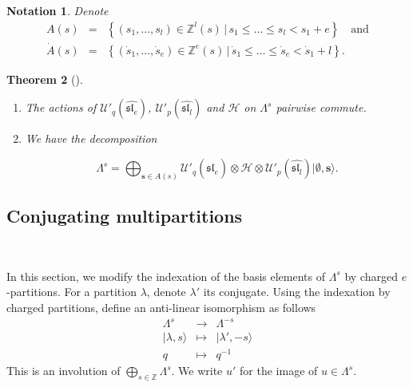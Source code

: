 \documentclass[twoside,12pt]{amsart}
\theoremstyle{plain}
\newcommand{\cH}{\mathcal{H}}
\newcommand{\Z}{\mathbb{Z}}
\newcommand{\bs}{\mathbf{s}}
\newcommand{\la}{\lambda}
\newcommand{\La}{\Lambda}
\newcommand{\dA}{\dot{A}}
\newcommand{\ds}{\dot{s}}
\newcommand{\lra}{\longrightarrow}
\newcommand{\Ue}{\mathcal{U}'_q (\widehat{\mathfrak{sl}_e})}
\newcommand{\Ul}{\mathcal{U}'_p (\widehat{\mathfrak{sl}_l})}
\newcommand{\bemp}{\boldsymbol{\emptyset}}
\newtheorem{num}{Notation}[section]
\newtheorem{thm}[num]{Theorem}
\theoremstyle{remark}
\begin{document}
\begin{num}\label{fund_dom} Denote 
$$\begin{array}{rcl} 
A(s) & = & \left\{ (s_1,\dots,s_l)\in \Z^l(s) \, | \, s_1 \leq \dots \leq s_l < s_1+e \right\} \quad\text{and}\\
\dA(s) & = & \left\{ (\ds_1,\dots,\ds_e)\in \Z^e(s) \, | \, \ds_1 \leq \dots \leq \ds_e < \ds_1+l \right\}.
  \end{array}$$
\end{num}

 
\begin{thm}[\mbox{\cite[Proposition 4.6 and Theorem 4.8]{Uglov1999}}] \label{thm_uglov} \
\begin{enumerate}
 \item The actions of $\Ue$, $\Ul$ and $\cH$ on $\La^s$ pairwise commute.
 \item We have the decomposition
 
 \begin{equation}\label{decomp_triple}
\La^s = \bigoplus_{\bs\in A(s)} \Ue \otimes \cH \otimes \Ul  |\bemp,\bs\rangle.
\end{equation}
\end{enumerate}
\end{thm}


















\subsection{Conjugating multipartitions}\label{conjugating} \

In this section,
we modify the indexation of the basis elements of $\La^s$ by charged $e$-partitions.
For a partition $\la$, denote $\la'$ its conjugate.
Using the indexation by charged partitions,
define an anti-linear isomorphism as follows
\begin{equation}\label{conj}
\begin{array}{cccc}
\La^s & \lra & \La^{-s} \\ 
| \la,s\rangle & \longmapsto & |\la',-s\rangle \\
q & \longmapsto & q^{-1}
\end{array}
\end{equation}
This is an involution of $\bigoplus_{s\in\Z}\La^s$.
We write $u'$ for the image of $u\in \La^s$.
\end{document}
